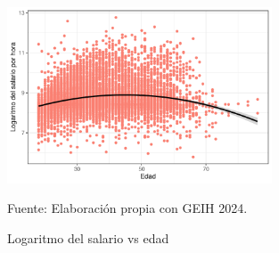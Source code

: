         \begin{figure}[H]
            \caption{Logaritmo del salario vs edad}
            \centering
            \includegraphics[width=0.7\textwidth]{imagenes/dispersion2.pdf}
             \label{fig:scatter2}
            \begin{minipage}{7\textwidth}
            \footnotesize
            \hspace{3cm} Fuente: Elaboración propia con GEIH 2024.
       
            \end{minipage}
        \end{figure}